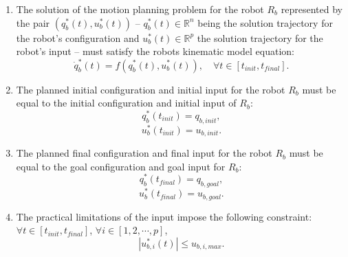 \documentclass[eprint]{actapoly}
\begin{document}
\begin{enumerate}

    \item The solution of the motion planning problem
    for the robot $R_b$ represented by the pair
    $(q^{*}_b(t), u^{*}_b(t))$ --
    $q^{*}_b(t) \in \mathbb{R}^n$ being the solution trajectory for
    the robot's configuration and $u^{*}_b(t) \in \mathbb{R}^p$ the solution
    trajectory for the robot's input -- must satisfy the
    robots kinematic model equation:   
    \begin{equation}
        \dot{q}^{*}_b(t) = f(q^{*}_b(t),u^{*}_b(t)),\quad \forall t \in [t_{init}, t_{final}].
    \end{equation}
    
    \item The planned initial configuration and initial 
    input for the robot $R_b$ must
    be equal to the initial configuration and initial
    input of $R_b$:
    \begin{equation}
        q^{*}_{b}(t_{init}) = q_{b,init},
    \end{equation}
    \begin{equation}
        u^{*}_{b}(t_{init}) = u_{b,init}.
    \end{equation}

    \item The planned final configuration and final 
    input for the robot $R_b$ must
    be equal to the goal configuration and goal
    input for $R_b$:
    \begin{equation}\label{eq:finalconfig}
        q^{*}_{b}(t_{final}) = q_{b,goal},
    \end{equation}
    \begin{equation}\label{eq:finalinput}
        u^{*}_{b}(t_{final}) = u_{b,goal}.
    \end{equation}

    \item The practical limitations of the input impose
    the following constraint: $\forall t \in [t_{init}, t_{final}]$, $\forall i \in [1,2,\cdots, p]$,
    \begin{equation}
        |u^{*}_{b,i}(t)| \leq u_{b,i,max}.
    \end{equation}
    

\end{enumerate}
\end{document}
